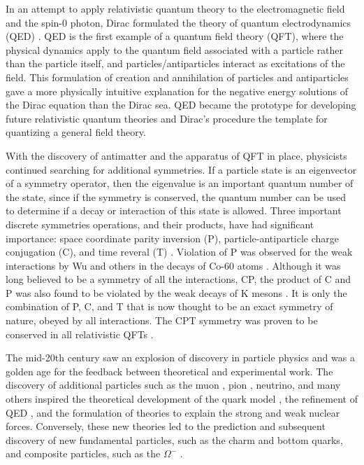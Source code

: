 \indent In an attempt to apply relativistic quantum theory to the electromagnetic field and the spin-0 photon, Dirac formulated the theory of quantum electrodynamics (QED) \cite{Dirac243}. QED is the first example of a quantum field theory (QFT), where the physical dynamics apply to the quantum field associated with a particle rather than the particle itself, and particles/antiparticles interact as excitations of the field. This formulation of creation and annihilation of particles and antiparticles gave a more physically intuitive explanation for the negative energy solutions of the Dirac equation than the Dirac sea. QED became the prototype for developing future relativistic quantum theories and Dirac's procedure the template for quantizing a general field theory. 

\indent With the discovery of antimatter and the apparatus of QFT in place, physicists continued searching for additional symmetries. If a particle state is an eigenvector of a symmetry operator, then the eigenvalue is an important quantum number of the state, since if the symmetry is conserved, the quantum number can be used to determine if a decay or interaction of this state is allowed. Three important discrete symmetries operations, and their products, have had significant importance: space coordinate parity inversion (P), particle-antiparticle charge conjugation (C), and time reveral (T) \cite{Bettini}. Violation of P was observed for the weak interactions by Wu and others in the decays of Co-60 atoms \cite{PhysRev.105.1413}. Although it was long believed to be a symmetry of all the interactions, CP, the product of C and P was also found to be violated by the weak decays of K mesons \cite{PhysRevLett.13.138}. It is only the combination of P, C, and T that is now thought to be an exact symmetry of nature, obeyed by all interactions. The CPT symmetry was proven to be conserved in all relativistic QFTs \cite{PhysRev.82.914, Luders:1954zz}.

\indent The mid-20th century saw an explosion of discovery in particle physics and was a golden age for the feedback between theoretical and experimental work. The discovery of additional particles such as the muon \cite{PhysRev.50.263}, pion \cite{Lattes:1947mx}, neutrino\cite{1956Sci...124..103C}, and many others inspired the theoretical development of the quark model \cite{GellMann:1964nj}, the refinement of QED \cite{PhysRev.73.416, PhysRev.74.1439, PhysRev.76.749, PhysRev.76.769, PhysRev.80.440, Tomonaga:1946zz, PhysRev.75.486, PhysRev.75.1736}, and the formulation of theories to explain the strong \cite{GellMann:1964nj, Zweig:1981pd, Zweig:1964jf, PhysRevLett.30.1346, PhysRevD.8.3633} and weak \cite{Fermi:1933jpa} nuclear forces. Conversely, these new theories led to the prediction and subsequent discovery of new fundamental particles, such as the charm \cite{PhysRevLett.33.1406, PhysRevLett.33.1404} and bottom \cite{PhysRevLett.39.252} quarks, and composite particles, such as the $\Omega^-$ \cite{Barnes:1964pd}.

